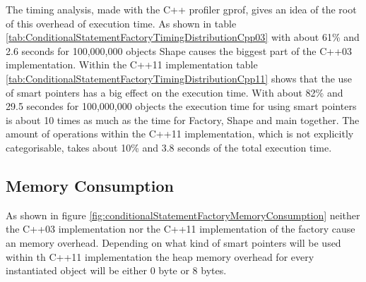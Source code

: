 {\noindent The timing analysis, made with the C++ profiler gprof, gives an idea of the root of this overhead of execution time. As shown in table \ref{tab:ConditionalStatementFactoryTimingDistributionCpp03} with about 61\% and 2.6 seconds for 100,000,000 objects Shape causes the biggest part of the C++03 implementation. Within the C++11 implementation table \ref{tab:ConditionalStatementFactoryTimingDistributionCpp11} shows that the use of smart pointers has a big effect on the execution time. With about 82\% and 29.5 secondes for 100,000,000 objects the execution time for using smart pointers is about 10 times as much as the time for Factory, Shape and main together. The amount of operations within the C++11 implementation, which is not explicitly categorisable, takes about 10\% and 3.8 seconds of the total execution time. 



\subsection{Memory Consumption}\label{sec:memoryConsumptionConditionalStatementFactory}
\noindent As shown in figure \ref{fig:conditionalStatementFactoryMemoryConsumption} neither the C++03 implementation nor the C++11 implementation of the factory cause an memory overhead. Depending on what kind of smart pointers will be used within th C++11 implementation the heap memory overhead for every instantiated object will be either 0 byte or 8 bytes.

}
